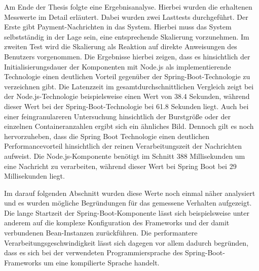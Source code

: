 Am Ende der Thesis folgte eine Ergebnisanalyse. Hierbei wurden die erhaltenen Messwerte im Detail erläutert. Dabei wurden zwei Lasttests durchgeführt. Der Erste gibt Payment-Nachrichten in das System. Hierbei muss das System selbstständig in der Lage sein, eine entsprechende Skalierung vorzunehmen. Im zweiten Test wird die Skalierung als Reaktion auf direkte Anweisungen des Benutzers vorgenommen. Die Ergebnisse hierbei zeigen, dass es hinsichtlich der Initialisierungsdauer der Komponenten mit Node.js als implementierende Technologie einen deutlichen Vorteil gegenüber der Spring-Boot-Technologie zu verzeichnen gibt. Die Latenzzeit im gesamtdurchschnittlichen Vergleich zeigt bei der Node.js-Technologie beispielsweise einen Wert von 38.4 Sekunden, während dieser Wert bei der Spring-Boot-Technologie bei 61.8 Sekunden liegt. Auch bei einer feingranulareren Untersuchung hinsichtlich der Burstgröße oder der einzelnen Containeranzahlen ergibt sich ein ähnliches Bild. Dennoch gilt es noch hervorzuheben, dass die Spring Boot Technologie einen deutlichen Performancevorteil hinsichtlich der reinen Verarbeitungszeit der Nachrichten aufweist. Die Node.js-Komponente benötigt im Schnitt 388 Millisekunden um eine Nachricht zu verarbeiten, während dieser Wert bei Spring Boot bei 29 Millisekunden liegt. 

Im darauf folgenden Abschnitt wurden diese Werte noch einmal näher analysiert und es wurden mögliche Begründungen für das gemessene Verhalten aufgezeigt. Die lange Startzeit der Spring-Boot-Komponente lässt sich beispielsweise unter anderem auf die komplexe Konfiguration des Frameworks und der damit verbundenen Bean-Instanzen zurückführen. Die performantere Verarbeitungsgeschwindigkeit lässt sich dagegen vor allem dadurch begründen, dass es sich bei der verwendeten Programmiersprache des Spring-Boot-Frameworks um eine kompilierte Sprache handelt.